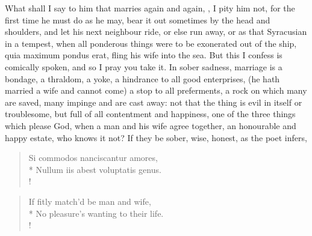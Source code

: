 What shall I say to him that marries again and again, , I pity him not, for the first time
he must do as he may, bear it out sometimes by the head and shoulders,
and let his next neighbour ride, or else run away, or as that
Syracusian in a tempest, when all ponderous things were to be
exonerated out of the ship, quia maximum pondus erat, fling his wife
into the sea. But this I confess is comically spoken, and so I
pray you take it. In sober sadness, marriage is a bondage, a
thraldom, a yoke, a hindrance to all good enterprises, (he hath married
a wife and cannot come) a stop to all preferments, a rock on which many
are saved, many impinge and are cast away: not that the thing is evil
in itself or troublesome, but full of all contentment and happiness,
one of the three things which please God,  when a man and his
wife agree together, an honourable and happy estate, who knows it not?
If they be sober, wise, honest, as the poet infers,

\begin{latin}
\begin{verse}%
Si commodos nanciscantur amores,\\*
Nullum iis abest voluptatis genus.\\!
\end{verse}%
\end{latin}
\translationrule%
\begin{verse}%
If fitly match'd be man and wife,\\*
No pleasure's wanting to their life.\\!
\end{verse}%
%


